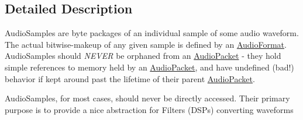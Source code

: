 \subsection{Detailed Description}
Audio\-Samples are byte packages of an individual sample of some audio waveform. The actual bitwise-\/makeup of any given sample is defined by an \hyperlink{struct_d_x_1_1_audio_1_1_audio_format}{Audio\-Format}. Audio\-Samples should {\itshape N\-E\-V\-E\-R} be orphaned from an \hyperlink{class_d_x_1_1_audio_1_1_audio_packet}{Audio\-Packet} -\/ they hold simple references to memory held by an \hyperlink{class_d_x_1_1_audio_1_1_audio_packet}{Audio\-Packet}, and have undefined (bad!) behavior if kept around past the lifetime of their parent \hyperlink{class_d_x_1_1_audio_1_1_audio_packet}{Audio\-Packet}. 

Audio\-Samples, for most cases, should never be directly accessed. Their primary purpose is to provide a nice abstraction for Filters (D\-S\-Ps) converting waveforms 


